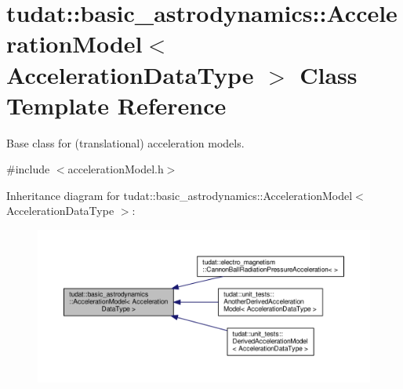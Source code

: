 \hypertarget{classtudat_1_1basic__astrodynamics_1_1AccelerationModel}{}\section{tudat\+:\+:basic\+\_\+astrodynamics\+:\+:Acceleration\+Model$<$ Acceleration\+Data\+Type $>$ Class Template Reference}
\label{classtudat_1_1basic__astrodynamics_1_1AccelerationModel}


Base class for (translational) acceleration models.  




{\ttfamily \#include $<$acceleration\+Model.\+h$>$}



Inheritance diagram for tudat\+:\+:basic\+\_\+astrodynamics\+:\+:Acceleration\+Model$<$ Acceleration\+Data\+Type $>$\+:
\nopagebreak
\begin{figure}[H]
\begin{center}
\leavevmode
\includegraphics[width=350pt]{classtudat_1_1basic__astrodynamics_1_1AccelerationModel__inherit__graph}
\end{center}
\end{figure}
